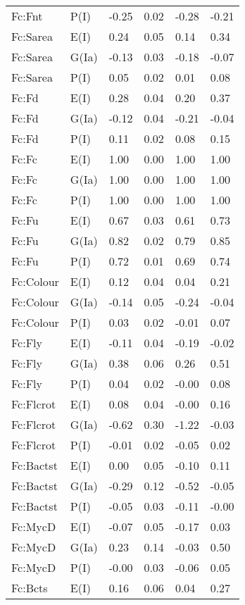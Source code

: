 \begin{center}
\begin{longtable}{|p{1.1in}|p{0.7in}|p{0.7in}|p{0.6in}|p{0.6in}|p{0.6in}|}
  Fc:Fnt & P(I) & -0.25 & 0.02 & -0.28 & -0.21 \\ 
  Fc:Sarea & E(I) & 0.24 & 0.05 & 0.14 & 0.34 \\ 
  Fc:Sarea & G(Ia) & -0.13 & 0.03 & -0.18 & -0.07 \\ 
  Fc:Sarea & P(I) & 0.05 & 0.02 & 0.01 & 0.08 \\ 
  Fc:Fd & E(I) & 0.28 & 0.04 & 0.20 & 0.37 \\ 
  Fc:Fd & G(Ia) & -0.12 & 0.04 & -0.21 & -0.04 \\ 
  Fc:Fd & P(I) & 0.11 & 0.02 & 0.08 & 0.15 \\ 
  Fc:Fc & E(I) & 1.00 & 0.00 & 1.00 & 1.00 \\ 
  Fc:Fc & G(Ia) & 1.00 & 0.00 & 1.00 & 1.00 \\ 
  Fc:Fc & P(I) & 1.00 & 0.00 & 1.00 & 1.00 \\ 
  Fc:Fu & E(I) & 0.67 & 0.03 & 0.61 & 0.73 \\ 
  Fc:Fu & G(Ia) & 0.82 & 0.02 & 0.79 & 0.85 \\ 
  Fc:Fu & P(I) & 0.72 & 0.01 & 0.69 & 0.74 \\ 
  Fc:Colour & E(I) & 0.12 & 0.04 & 0.04 & 0.21 \\ 
  Fc:Colour & G(Ia) & -0.14 & 0.05 & -0.24 & -0.04 \\ 
  Fc:Colour & P(I) & 0.03 & 0.02 & -0.01 & 0.07 \\ 
  Fc:Fly & E(I) & -0.11 & 0.04 & -0.19 & -0.02 \\ 
  Fc:Fly & G(Ia) & 0.38 & 0.06 & 0.26 & 0.51 \\ 
  Fc:Fly & P(I) & 0.04 & 0.02 & -0.00 & 0.08 \\ 
  Fc:Flcrot & E(I) & 0.08 & 0.04 & -0.00 & 0.16 \\ 
  Fc:Flcrot & G(Ia) & -0.62 & 0.30 & -1.22 & -0.03 \\ 
  Fc:Flcrot & P(I) & -0.01 & 0.02 & -0.05 & 0.02 \\ 
  Fc:Bactst & E(I) & 0.00 & 0.05 & -0.10 & 0.11 \\ 
  Fc:Bactst & G(Ia) & -0.29 & 0.12 & -0.52 & -0.05 \\ 
  Fc:Bactst & P(I) & -0.05 & 0.03 & -0.11 & -0.00 \\ 
  Fc:MycD & E(I) & -0.07 & 0.05 & -0.17 & 0.03 \\ 
  Fc:MycD & G(Ia) & 0.23 & 0.14 & -0.03 & 0.50 \\ 
  Fc:MycD & P(I) & -0.00 & 0.03 & -0.06 & 0.05 \\ 
  Fc:Bcts & E(I) & 0.16 & 0.06 & 0.04 & 0.27 \\ 

\end{longtable}
\end{center}

